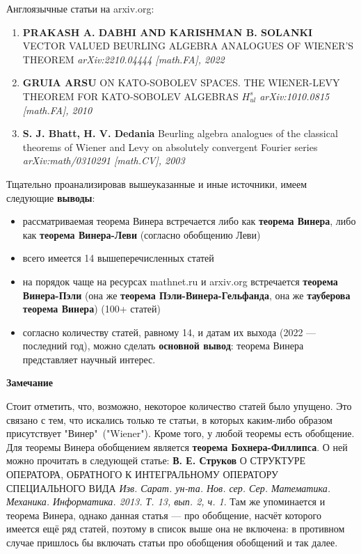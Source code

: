 \documentclass[12pt]{extarticle}
\theoremstyle{definition}
\begin{document}
  	Англоязычные статьи на arxiv.org:
  	\begin{enumerate}
		\item \textbf{PRAKASH A. DABHI AND KARISHMAN B. SOLANKI} VECTOR VALUED BEURLING ALGEBRA ANALOGUES OF
		WIENER’S THEOREM \textit{arXiv:2210.04444 [math.FA], 2022}
		\item \textbf{GRUIA ARSU} ON KATO-SOBOLEV SPACES. THE WIENER-LEVY THEOREM FOR KATO-SOBOLEV ALGEBRAS $H^s_{ul}$ \textit{arXiv:1010.0815 [math.FA], 2010}
		\item \textbf{S. J. Bhatt, H. V. Dedania} Beurling algebra analogues of the classical theorems of Wiener and Levy on absolutely convergent Fourier series \textit{	arXiv:math/0310291 [math.CV], 2003}
  	\end{enumerate}
  	Тщательно проанализировав вышеуказанные и иные источники, имеем следующие \textbf{выводы}:
  		\begin{itemize}
			\item рассматриваемая теорема Винера встречается либо как \textbf{теорема Винера}, либо как \textbf{теорема Винера-Леви} (согласно обобщению Леви)
			\item всего имеется 14 вышеперечисленных статей
			\item на порядок чаще на ресурсах mathnet.ru и arxiv.org встречается \textbf{теорема Винера-Пэли} (она же \textbf{теорема Пэли-Винера-Гельфанда}, она же \textbf{тауберова теорема Винера}) (100+ статей)
			\item согласно количеству статей, равному 14, и датам их выхода (2022 — последний год), можно сделать \textbf{основной вывод}: теорема Винера представляет научный интерес.
  		\end{itemize}
  	\textbf{Замечание}
  	
  	Стоит отметить, что, возможно, некоторое количество статей было упущено. Это связано с тем, что искались только те статьи, в которых каким-либо образом присутствует "Винер"\ ("Wiener"). Кроме того, у любой теоремы есть обобщение. Для теоремы Винера обобщением является \textbf{теорема Бохнера-Филлипса}. О ней можно прочитать в следующей статье: \textbf{В. Е. Струков} О СТРУКТУРЕ ОПЕРАТОРА, ОБРАТНОГО К ИНТЕГРАЛЬНОМУ ОПЕРАТОРУ
  	СПЕЦИАЛЬНОГО ВИДА \textit{Изв. Сарат. ун-та. Нов. сер. Сер. Математика. Механика. Информатика. 2013. Т. 13, вып. 2, ч. 1}. Там же упоминается и теорема Винера, однако данная статья — про обобщение, насчёт которого имеется ещё ряд статей, поэтому в список выше она не включена: в противном случае пришлось бы включать статьи про обобщения обобщений и так далее.
\end{document}
